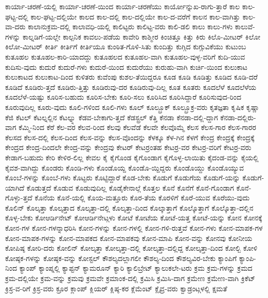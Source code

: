 {ಕಾರ್ಯಾ-ಚರಣೆ-ಯಲ್ಲಿ
ಕಾರ್ಯಾ-ಚರಣೆ-ಯಿಂದ
ಕಾರ್ಯಾ-ಚರಣೆಯು
ಕಾರ್ಯೋನ್ನುಖ-ರಾಗು-ತ್ತಾರೆ
ಕಾಲ
ಕಾಲ-ಘಟ್ಟ-ದಲ್ಲಿ
ಕಾಲ-ಘಟ್ಟ-ದಲ್ಲಿಯೇ
ಕಾಲದ
ಕಾಲ-ದಲ್ಲಿ
ಕಾಲ-ದಲ್ಲಿಯೇ
ಕಾಲ-ದ-ವರೆಗೆ
ಕಾಲನ
ಕಾಲ-ವಾಗಿತ್ತು
ಕಾಲ-ವಾ-ದರು
ಕಾಲಾನುಕ್ರಮ-ದಲ್ಲಿ
ಕಾಲಾವಧಿ-ಯಲ್ಲಿ
ಕಾಲಿಟ್ಟರು
ಕಾಲಿಟ್ಟ-ವರು
ಕಾಲಿ-ಡಲಿ
ಕಾಲು
ಕಾಲು-ಗಳು
ಕಾಲುವೆ-ಗಳನ್ನು
ಕಾಲ್ನಡಿಗೆ-ಯಲ್ಲೇ
ಕಾಲ್ಪನಿಕ
ಕಾವಲು-ಪಡೆಯ
ಕಾವೇರಿ
ಕಾಶ್ಮೀರ
ಕಿಂಚಿತ್ತೂ
ಕಿತ್ತು
ಕಿರು
ಕಿಲೊ-ಮೀಟರ್
ಕಿಲೋ
ಕಿಲೋ-ಮೀಟರ್
ಕೀರ್ತಿ
ಕೀರ್ತಿಗೆ
ಕೀರ್ತಿಯೂ
ಕುಂಠಿತ-ಗೊಳಿ-ಸಿತು
ಕುಂದಿತ್ತು
ಕುಗ್ಗಿದ
ಕುಗ್ಗುವಿಕೆಯು
ಕುಟುಂಬ
ಕುತೂಹಲ
ಕುತೂಹಲ-ಕಾರಿ-ಯಾದದ್ದು
ಕುತೂಹಲದ
ಕುತೂಹಲ-ವಾಗಿ
ಕುತೂಹಲ-ವುಳ್ಳ-ವರಿಗೆ
ಕುದಿ-ಯುವ
ಕುದಿಸು-ವುದು
ಕುದುರೆ
ಕುದುರೆ-ಗಳು
ಕುದುರೆ-ಯಿಂದ
ಕುದುರೆಯು
ಕುರುಹು-ವಾಗಿ
ಕುರ್ಚಿ-ಯಿಂದ
ಕುಲುಕಾಟ
ಕುಲುಕಾಟದ
ಕುಲುಕಾಟ-ದಿಂದ
ಕುಳಿತರು
ಕುವೆಂಪು
ಕುಶಲ-ತೆಯಿದ್ದರೂ
ಕೂಡ
ಕೂಡಿ
ಕೂಡಿತ್ತು
ಕೂಡಿದ
ಕೂಡಿ-ದರೆ
ಕೂಡಿದೆ
ಕೂಡಿರು-ತ್ತದೆ
ಕೂಡಿರು-ತ್ತಿತ್ತು
ಕೂಡಿರುವು-ದರ
ಕೂಡಿರುವು-ದಿಲ್ಲ
ಕೂತ
ಕೂತರು
ಕೂದಲೆಳೆ
ಕೂದಲೆಳೆಯ
ಕೂದಲೆಳೆ-ಯಷ್ಟು
ಕೂರಿಸ-ಬಹುದು
ಕೂರಿಸ-ಬೇಕು
ಕೂರಿ-ಸಲು
ಕೂರಿಸಿದ
ಕೂರಿಸಿದ್ದಾರೆ
ಕೂರಿಸುವುದ-ರಿಂದ
ಕೂರುವುದಿಲ್ಲ
ಕೂರು-ವುದು
ಕೂಲಿ-ಗಳಿಂದ
ಕೂಲಿ-ಗಳು
ಕೂಲ್
ಕೂಲ್ಬ್ರೂಕ್
ಕೂಲ್ಬ್ರೂಕ್ರ-ವರು
ಕೃತಜ್ಞತಾ
ಕೃಷಿಕ
ಕೃಷ್ಣಾ
ಕೆಜಿ
ಕೆಟಲ್
ಕೆಟಲ್ನಲ್ಲಿನ
ಕೆಟಲ್ನ್ನು
ಕೆಡವ-ಬೇಕಾಗು-ತ್ತದೆ
ಕೆಡಸ್ಟ್ರಲ್
ಕೆತ್ತಿ
ಕೆನಡಾ
ಕೆನಡಾ-ದಲ್ಲಿ-ದ್ದಾಗ
ಕೆನಡಾ-ದಲ್ಲಿರು-ವಾಗ
ಕೆಮ್ಮಿ-ನಿಂದ
ಕೆರೆ
ಕೆಲ-ವರ
ಕೆಲವ-ರಿಂದ
ಕೆಲವು
ಕೆಲವೆಡೆ
ಕೆಲವೇ
ಕೆಲವೊಮ್ಮೆ
ಕೆಲಸ
ಕೆಲಸ-ಗಾರ
ಕೆಲಸ-ಗಾರರ
ಕೆಲಸದ
ಕೆಲಸ-ದಲ್ಲಿ
ಕೆಲಸ-ದಿಂದ
ಕೆಲಸ-ವನ್ನು
ಕೆಲಸ-ವೊಂದನ್ನು
ಕೆಳಕ್ಕೂ
ಕೆಳ-ಗಿನ
ಕೆಳಗೆ
ಕೇಂದ್ರ
ಕೇಂದ್ರಕ್ಕೆ
ಕೇಂದ್ರಕ್ಕೆ
ಕೇಂದ್ರದ
ಕೇಂದ್ರ-ದಿಂದಲೇ
ಕೇಂದ್ರ-ವನ್ನು
ಕೇಂದ್ರವು
ಕೇಟರ್
ಕೇಟರ್ರಂತಹ
ಕೇಟರ್ರ-ವರ
ಕೇಟರ್ರ-ವರಿಗೆ
ಕೇಟರ್ರ-ವರು
ಕೇಡಾಗ-ಬಹುದು
ಕೇರಿ
ಕೇಳಿರ-ಲಿಲ್ಲ
ಕೇವಲ
ಕೈ
ಕೈಗೊಂಡ
ಕೈಗೊಂಡಾಗ
ಕೈಗೊಳ್ಳ-ಲಾಯಿತು
ಕೈದಂಡ-ವನ್ನು
ಕೈಯಲ್ಲಿ
ಕೈವಶ-ವಾಗಿದ್ದು
ಕೊಂಡರು
ಕೊಂಡಿ-ಗಳು
ಕೊಂಡೊಯ್ದ
ಕೊಂಡೊ-ಯ್ದಿದ್ದರು
ಕೊಂಡೊಯ್ದು
ಕೊಂಡೊಯ್ಯುವ
ಕೊಂಬೆ-ಗಳನ್ನು
ಕೊಂಬೆ-ಗಳು
ಕೊಟ್ಟರು
ಕೊಟ್ಟಿದ್ದಾರೆ
ಕೊಡ-ಬೇಕು
ಕೊಡುಗೆ
ಕೊಡುಗೆಯ
ಕೊಡುಗೆ-ಯನ್ನು
ಕೊಡುಗೆ-ಯಾಗಿದೆ
ಕೊಡುತ್ತದೆ
ಕೊಡುವ
ಕೊಡುವುದಿಲ್ಲ
ಕೊಡೈಕೇನಾಲ್ಗೆ
ಕೊತ್ತಲ
ಕೊನೆ
ಕೊನೆಗೆ
ಕೊನೆ-ಗೊಂಡಾಗ
ಕೊನೆ-ಗೊಳ್ಳು-ತ್ತದೆ
ಕೊನೆಯ
ಕೊನೆ-ಯಲ್ಲಿ
ಕೊಯ-ಮತ್ತೂರು
ಕೊರ-ತೆಯ
ಕೊರಳಿಗೆ
ಕೊರೆ-ಯುವ
ಕೊರೆಯು-ವುದು
ಕೊಲಿನ್
ಕೊಲ್ಕತ್ತಾ
ಕೊಲ್ಕತ್ತಾದ
ಕೊಲ್ಕತ್ತಾ-ದಲ್ಲಿ
ಕೊಲ್ಕತ್ತಾ-ದಿಂದ
ಕೊಲ್ಕಾತ್ತಾಗೆ
ಕೊಲ್ಕೊತ್ತಾಗೆ
ಕೊಲ್ಕೊತ್ತಾ-ದಲ್ಲಿನ
ಕೊಳ್ಳ-ಬೇಕು
ಕೋಆರ್ಡಿನೇಟ್
ಕೋಆರ್ಡಿನೇಟ್ಗಳು
ಕೋಟೆ
ಕೋಟೆಯ
ಕೋಟೆ-ಯತ್ತ
ಕೋಟೆ-ಯನ್ನು
ಕೋನ
ಕೋನಕ್ಕೆ
ಕೋನ-ಗಳ
ಕೋನ-ಗಳನ್ನಾಧರಿಸಿ
ಕೋನ-ಗಳನ್ನು
ಕೋನ-ಗಳಲ್ಲಿ
ಕೋನ-ಗಳಿ-ರುತ್ತವೆ
ಕೋನ-ಗಳು
ಕೋನ-ಮಾಪಕ-ಗಳ
ಕೋನ-ಮಾಪಕ-ಗಳನ್ನು
ಕೋನ-ಮಾಪಕದ
ಕೋನ-ಮಾಪಕವು
ಕೋನ-ಮಾಪಿ
ಕೋನ-ವನ್ನು
ಕೋನವು
ಕೋನೀಯ
ಕೋಪಿಷ್ಠ
ಕೋರಿ-ದರು
ಕೋಲಿನ್
ಕೋಲ್ಕತ್ತಾ
ಕೋಲ್ಕತ್ತಾ-ದಲ್ಲಿ
ಕೋಲ್ಕತ್ತಾ-ದಲ್ಲಿದ್ದ
ಕೋಲ್ಕತ್ತಾ-ದಿಂದ
ಕೋಲ್ಬಿ
ಕೋಳಿ
ಕೋಷ್ಠಕ-ಗಳನ್ನು
ಕೋಷ್ಠಕ-ವನ್ನು
ಕೋಸ್ಟಲ್
ಕೌಶಲ್ಯದಲ್ಲಾಗಲೀ
ಕೌಶಲ್ಯ-ದಿಂದ
ಕೌಶಲ್ಯವಿರ-ಬೇಕು
ಕ್ಯಾಂಪಿಗೆ
ಕ್ಯಾಂಪಿ-ನಿಂದ
ಕ್ಯಾಂಪ್
ಕ್ಯಾಂಪ್ನಲ್ಲಿ
ಕ್ಯಾಪ್ಟನ್
ಕ್ಯಾಮರೂನ್
ಕ್ಯಾರಿ
ಕ್ಯಾಲಿಬ್ರೇಟ್
ಕ್ಯಾಲುಕಲೇ-ಟರು
ಕ್ರಮ
ಕ್ರಮ-ಗಳನ್ನು
ಕ್ರಮದ
ಕ್ರಮ-ದಲ್ಲಿಯೇ
ಕ್ರಮ-ವನ್ನು
ಕ್ರಮವು
ಕ್ರಮವೇ
ಕ್ರಮಾಂಕ-ದಲ್ಲಿ
ಕ್ರಮಿಸಿ
ಕ್ರಮಿಸಿ-ದಾಗ
ಕ್ರಮೇಣ
ಕ್ರಮೇಣ-ವಾಗಿ
ಕ್ರಿಕೆಟ್
ಕ್ರಿಸ್ರ-ವ-ರಿಗೆ
ಕ್ರಿಸ್ರ-ವರು
ಕ್ರೂರ
ಕ್ಲಾಂಪ್
ಕ್ಲಿಯರ್
ಕ್ಲಿಷ್ಠ-ಕರ
ಕ್ಲೆಮೆಂಟ್
ಕ್ಲೈವ್ರ-ವರು
ಕ್ವಾಡ್ರಂಟ್ಗಳಲ್ಲಿ
ಕ್ಷಮತೆ
}
